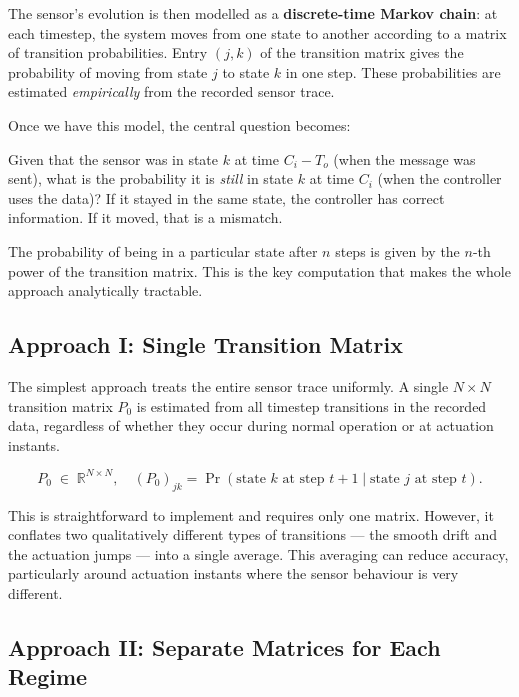 The sensor's evolution is then modelled as a \textbf{discrete-time Markov
chain}: at each timestep, the system moves from one state to another
according to a matrix of transition probabilities. Entry $(j, k)$ of the
transition matrix gives the probability of moving from state $j$ to state
$k$ in one step. These probabilities are estimated \emph{empirically} from
the recorded sensor trace.
 
Once we have this model, the central question becomes:
 
\begin{insightbox}
Given that the sensor was in state $k$ at time $C_i - T_o$ (when the
message was sent), what is the probability it is \emph{still} in state $k$
at time $C_i$ (when the controller uses the data)? If it stayed in the same
state, the controller has correct information. If it moved, that is a
mismatch.
\end{insightbox}
 
The probability of being in a particular state after $n$ steps is given by
the $n$-th power of the transition matrix. This is the key computation that
makes the whole approach analytically tractable.
 
\subsection{Approach I: Single Transition Matrix}
 
The simplest approach treats the entire sensor trace uniformly. A single
$N \times N$ transition matrix $P_0$ is estimated from all timestep
transitions in the recorded data, regardless of whether they occur during
normal operation or at actuation instants.
 
\[
  P_0 \;\in\; \mathbb{R}^{N \times N},
  \quad
  (P_0)_{jk} = \Pr(\text{state } k \text{ at step } t{+}1
                    \mid \text{state } j \text{ at step } t).
\]
 
This is straightforward to implement and requires only one matrix. However,
it conflates two qualitatively different types of transitions --- the smooth
drift and the actuation jumps --- into a single average. This averaging can
reduce accuracy, particularly around actuation instants where the sensor
behaviour is very different.
 
\subsection{Approach II: Separate Matrices for Each Regime}
 
